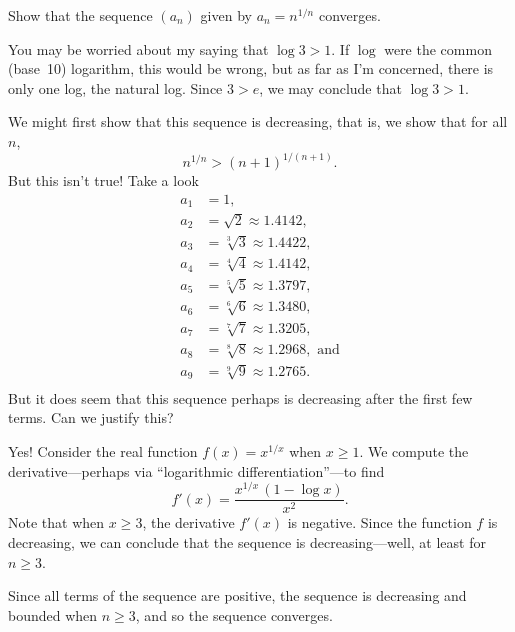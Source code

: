 \documentclass{ximera}
\begin{document}
\begin{example}
\label{example:nth-root-of-n}
Show that the sequence $(a_n)$ given by $a_n = n^{1/n}$ converges.
\end{example}

\begin{warning}
You may be worried about my saying that $\log 3 > 1$.  If
  $\log$ were the common (base~10) logarithm, this would be wrong, but
  as far as I'm concerned, there is only one log, the natural log.
  Since $3 > e$, we may conclude that $\log 3 > 1$.
\end{warning}

\begin{explanation}
  We might first show that this sequence is decreasing, that is, we show
  that for all $n$,
  $$
  n^{1/n} > (n+1)^{1/(n+1)}.
  $$
  But this isn't true!  Take a look
  \begin{align*}
    a_1 &= 1, \\
    a_2 &= \sqrt{2} \approx 1.4142, \\
    a_3 &= \sqrt[3]{3} \approx 1.4422, \\
    a_4 &= \sqrt[4]{4} \approx 1.4142, \\
    a_5 &= \sqrt[5]{5} \approx 1.3797, \\
    a_6 &= \sqrt[6]{6} \approx 1.3480, \\
    a_7 &= \sqrt[7]{7} \approx 1.3205, \\
    a_8 &= \sqrt[8]{8} \approx 1.2968, \mbox{ and}\\
    a_9 &= \sqrt[9]{9} \approx 1.2765. \\
  \end{align*}
  But it does seem that this sequence perhaps is decreasing after the
  first few terms.  Can we justify this?

  Yes!  Consider the real function $ f(x)=x^{1/x}$ when $x\ge1$.
  We compute the derivative---perhaps via ``logarithmic differentiation''---to find
  $$
  f'(x)=\frac{x^{1/x} \, (1-\log x)}{x^2}.
  $$
  Note that when $x\ge 3$, the derivative $f'(x)$ is negative.  Since the function $f$ is decreasing, we can conclude that the sequence is decreasing---well, at least for $n \geq 3$.

  Since all terms of the sequence are positive, the sequence is
  decreasing and bounded when $n \ge 3$, and so the sequence converges.
\end{explanation}

\end{document}
